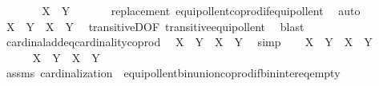 \begin{isabellebody}
\ \ \isamarkupfalse%
\ \isamarkupfalse%
\ {\isachardoublequoteopen}{\isachardot}{\kern0pt}{\isachardot}{\kern0pt}{\isachardot}{\kern0pt}\ {\isasymapprox}\ {\isacharbar}{\kern0pt}X{\isacharbar}{\kern0pt}\ {\isasymCoprod}\ {\isacharbar}{\kern0pt}Y{\isacharbar}{\kern0pt}{\isachardoublequoteclose}\ \isanewline
\ \ \ \ \isamarkupfalse%
\ replacement\ equipollent{\isacharunderscore}{\kern0pt}coprod{\isacharunderscore}{\kern0pt}if{\isacharunderscore}{\kern0pt}equipollent\ \isamarkupfalse%
\ auto\isanewline
\ \ \isamarkupfalse%
\ \isamarkupfalse%
\ {\isachardoublequoteopen}X\ {\isasymunion}\ Y\ {\isasymapprox}\ {\isacharbar}{\kern0pt}X{\isacharbar}{\kern0pt}\ {\isasymCoprod}\ {\isacharbar}{\kern0pt}Y{\isacharbar}{\kern0pt}{\isachardoublequoteclose}\ \isamarkupfalse%
\ transitiveD{\isacharbrackleft}{\kern0pt}OF\ transitive{\isacharunderscore}{\kern0pt}equipollent{\isacharbrackright}{\kern0pt}\ \isamarkupfalse%
\ blast\isanewline
\ \ \isamarkupfalse%
\ cardinal{\isacharunderscore}{\kern0pt}add{\isacharunderscore}{\kern0pt}eq{\isacharunderscore}{\kern0pt}cardinality{\isacharunderscore}{\kern0pt}coprod\ \isamarkupfalse%
\ {\isachardoublequoteopen}{\isacharbar}{\kern0pt}X{\isacharbar}{\kern0pt}\ {\isasymoplus}\ {\isacharbar}{\kern0pt}Y{\isacharbar}{\kern0pt}\ {\isacharequal}{\kern0pt}\ {\isacharbar}{\kern0pt}{\isacharbar}{\kern0pt}X{\isacharbar}{\kern0pt}\ {\isasymCoprod}\ {\isacharbar}{\kern0pt}Y{\isacharbar}{\kern0pt}{\isacharbar}{\kern0pt}{\isachardoublequoteclose}\ \isamarkupfalse%
\ simp\isanewline
\ \ \isamarkupfalse%
\ {\isachardoublequoteopen}{\isacharbar}{\kern0pt}X\ {\isasymunion}\ Y{\isacharbar}{\kern0pt}\ {\isacharequal}{\kern0pt}\ {\isacharbar}{\kern0pt}X{\isacharbar}{\kern0pt}\ {\isasymoplus}\ {\isacharbar}{\kern0pt}Y{\isacharbar}{\kern0pt}{\isachardoublequoteclose}\isanewline
\ \ \isamarkupfalse%
\ {\isacharminus}{\kern0pt}\isanewline
\ \ \ \ \isamarkupfalse%
\ {\isachardoublequoteopen}X\ {\isasymunion}\ Y\ {\isasymapprox}\ {\isacharbar}{\kern0pt}X{\isacharbar}{\kern0pt}\ {\isasymCoprod}\ {\isacharbar}{\kern0pt}Y{\isacharbar}{\kern0pt}{\isachardoublequoteclose}\ \isanewline
\ \ \ \ \ \ \isamarkupfalse%
\ assms\ cardinalization\ \ equipollent{\isacharunderscore}{\kern0pt}bin{\isacharunderscore}{\kern0pt}union{\isacharunderscore}{\kern0pt}coprod{\isacharunderscore}{\kern0pt}if{\isacharunderscore}{\kern0pt}bin{\isacharunderscore}{\kern0pt}inter{\isacharunderscore}{\kern0pt}eq{\isacharunderscore}{\kern0pt}empty\ \isanewline

\end{isabellebody}
